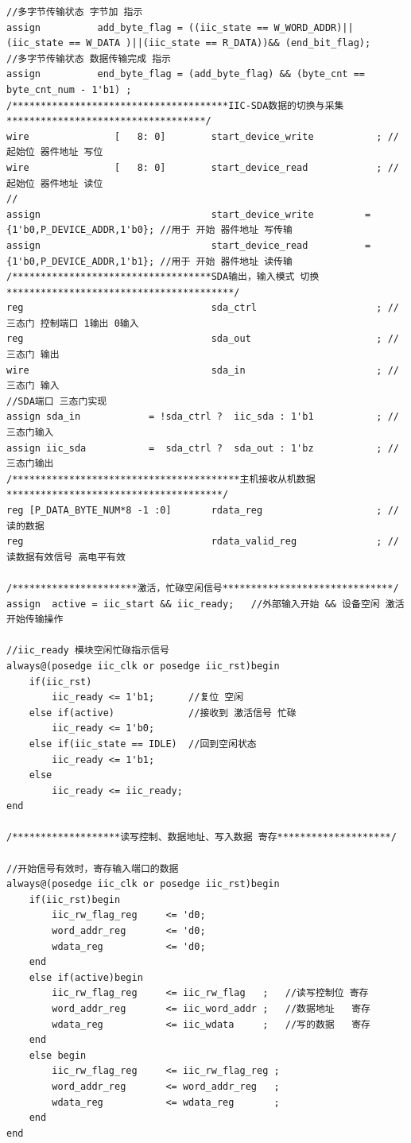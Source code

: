 \documentclass[a4paper,10pt]{article}
\begin{document}
\begin{lstlisting}[caption=iic_drive.v]
//多字节传输状态 字节加 指示
assign          add_byte_flag = ((iic_state == W_WORD_ADDR)||(iic_state == W_DATA )||(iic_state == R_DATA))&& (end_bit_flag);
//多字节传输状态 数据传输完成 指示
assign          end_byte_flag = (add_byte_flag) && (byte_cnt == byte_cnt_num - 1'b1) ; 
/**************************************IIC-SDA数据的切换与采集 ***********************************/
wire               [   8: 0]        start_device_write           ; // 起始位 器件地址 写位
wire               [   8: 0]        start_device_read            ; // 起始位 器件地址 读位
//
assign                              start_device_write         = {1'b0,P_DEVICE_ADDR,1'b0}; //用于 开始 器件地址 写传输
assign                              start_device_read          = {1'b0,P_DEVICE_ADDR,1'b1}; //用于 开始 器件地址 读传输
/***********************************SDA输出，输入模式 切换****************************************/
reg                                 sda_ctrl                     ; //三态门 控制端口 1输出 0输入
reg                                 sda_out                      ; //三态门 输出
wire                                sda_in                       ; //三态门 输入
//SDA端口 三态门实现
assign sda_in            = !sda_ctrl ?  iic_sda : 1'b1           ; //三态门输入
assign iic_sda           =  sda_ctrl ?  sda_out : 1'bz           ; //三态门输出
/****************************************主机接收从机数据**************************************/
reg [P_DATA_BYTE_NUM*8 -1 :0]       rdata_reg                    ; //读的数据
reg                                 rdata_valid_reg              ; //读数据有效信号 高电平有效

/**********************激活，忙碌空闲信号******************************/
assign  active = iic_start && iic_ready;   //外部输入开始 && 设备空闲 激活开始传输操作

//iic_ready 模块空闲忙碌指示信号
always@(posedge iic_clk or posedge iic_rst)begin
    if(iic_rst)
        iic_ready <= 1'b1;      //复位 空闲
    else if(active)             //接收到 激活信号 忙碌
        iic_ready <= 1'b0;
    else if(iic_state == IDLE)  //回到空闲状态
        iic_ready <= 1'b1;
    else 
        iic_ready <= iic_ready;
end

/*******************读写控制、数据地址、写入数据 寄存********************/

//开始信号有效时，寄存输入端口的数据
always@(posedge iic_clk or posedge iic_rst)begin
    if(iic_rst)begin
        iic_rw_flag_reg     <= 'd0;
        word_addr_reg       <= 'd0;
        wdata_reg           <= 'd0;
    end
    else if(active)begin
        iic_rw_flag_reg     <= iic_rw_flag   ;   //读写控制位 寄存
        word_addr_reg       <= iic_word_addr ;   //数据地址   寄存
        wdata_reg           <= iic_wdata     ;   //写的数据   寄存          
    end
    else begin
        iic_rw_flag_reg     <= iic_rw_flag_reg ;
        word_addr_reg       <= word_addr_reg   ;
        wdata_reg           <= wdata_reg       ;
    end
end


\end{lstlisting}
\end{document}
